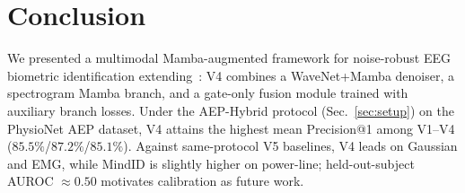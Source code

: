 \documentclass[conference,a4paper]{APSIPA2026}
\begin{document}
\section{Conclusion}
We presented a multimodal Mamba-augmented framework for noise-robust
EEG biometric identification extending~\cite{vu2026aisei}: V4 combines
a WaveNet+Mamba denoiser, a spectrogram Mamba branch, and a gate-only
fusion module trained with auxiliary branch losses.
Under the AEP-Hybrid protocol (Sec.~\ref{sec:setup}) on the PhysioNet
AEP dataset, V4 attains the highest mean Precision@1 among V1--V4
($85.5\%$/$87.2\%$/$85.1\%$). Against same-protocol V5 baselines, V4
leads on Gaussian and EMG, while MindID is slightly higher on
power-line; held-out-subject AUROC $\approx 0.50$ motivates calibration
as future work.

\AtNextBibliography{\footnotesize}
\setlength{\bibitemsep}{0pt plus 0.3ex}
\printbibliography
\end{document}
